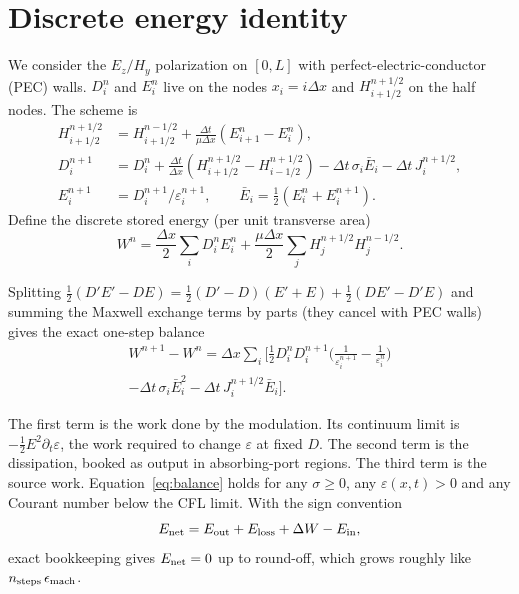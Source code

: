 \documentclass[aps,pre,reprint,superscriptaddress,amsmath,amssymb]{revtex4-2}
\begin{document}
\section{Discrete energy identity}

We consider the $E_z/H_y$ polarization on $[0,L]$ with perfect-electric-conductor
(PEC) walls. $D_i^n$ and $E_i^n$ live on the nodes $x_i=i\Delta x$ and
$H_{i+1/2}^{n+1/2}$ on the half nodes. The scheme is
\begin{align}
H^{n+1/2}_{i+1/2} &= H^{n-1/2}_{i+1/2} + \frac{\Delta t}{\mu\Delta x}\left(E^n_{i+1}-E^n_i\right),\\
D^{n+1}_i &= D^n_i + \frac{\Delta t}{\Delta x}\left(H^{n+1/2}_{i+1/2}-H^{n+1/2}_{i-1/2}\right)
 - \Delta t\,\sigma_i\bar E_i - \Delta t\,J_i^{n+1/2},\\
E^{n+1}_i &= D^{n+1}_i/\varepsilon_i^{n+1},\qquad \bar E_i=\tfrac12\left(E^n_i+E^{n+1}_i\right).
\end{align}
Define the discrete stored energy (per unit transverse area)
\begin{equation}
W^n = \frac{\Delta x}{2}\sum_i D^n_iE^n_i + \frac{\mu\Delta x}{2}\sum_j H^{n+1/2}_jH^{n-1/2}_j .
\end{equation}

Splitting $\tfrac12(D'E'-DE) = \tfrac12(D'-D)(E'+E) + \tfrac12(DE'-D'E)$ and summing
the Maxwell exchange terms by parts (they cancel with PEC walls) gives the exact
one-step balance
\begin{multline}
W^{n+1}-W^n = \Delta x\sum_i\Big[\tfrac12 D_i^nD_i^{n+1}\Big(\frac{1}{\varepsilon_i^{n+1}}-\frac{1}{\varepsilon_i^n}\Big)\\
-\Delta t\,\sigma_i\bar E_i^2-\Delta t\,J_i^{n+1/2}\bar E_i\Big].
\label{eq:balance}
\end{multline}

The first term is the work done by the modulation. Its continuum limit is
$-\tfrac12E^2\partial_t\varepsilon$, the work required to change $\varepsilon$ at
fixed $D$. The second term is the dissipation, booked as output in absorbing-port
regions. The third term is the source work. Equation~\eqref{eq:balance} holds for
any $\sigma\ge0$, any $\varepsilon(x,t)>0$ and any Courant number below the CFL
limit. With the sign convention
\begin{equation}
E_{\rm net} = E_{\rm out}+E_{\rm loss}+\Delta W - E_{\rm in},
\end{equation}
exact bookkeeping gives $E_{\rm net}=0$ up to round-off, which grows roughly like
$n_{\rm steps}\,\epsilon_{\rm mach}$.
\end{document}
